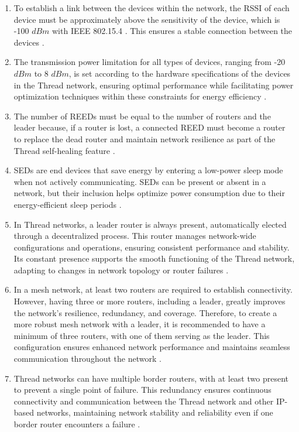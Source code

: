 \begin{enumerate}
    \item To establish a link between the devices within the network, the \gls{RSSI} of each device must be approximately above the sensitivity of the device, which is -100 $dBm$ with \gls{IEEE} 802.15.4 \cite{Semiconductor_Nordic_Product_Brief_2018_2.0}. This ensures a stable connection between the devices \cite{wu2014study}.
    \item The transmission power limitation for all types of devices, ranging from -20 $dBm$ to 8 $dBm$, is set according to the hardware specifications of the devices in the Thread network, ensuring optimal performance while facilitating power optimization techniques within these constraints for energy efficiency \cite{semiconductor_nrf52840_2018_1}.
    \item The number of \glspl{REED} must be equal to the number of routers and the leader because, if a router is lost, a connected \gls{REED} must become a router to replace the dead router and maintain network resilience as part of the Thread self-healing feature \cite{Thread_Group_Fundamentals}.
    \item \glspl{SED} are end devices that save energy by entering a low-power sleep mode when not actively communicating. \glspl{SED} can be present or absent in a network, but their inclusion helps optimize power consumption due to their energy-efficient sleep periods \cite{Thread_Group_Fundamentals}.
    \item In Thread networks, a leader router is always present, automatically elected through a decentralized process. This router manages network-wide configurations and operations, ensuring consistent performance and stability. Its constant presence supports the smooth functioning of the Thread network, adapting to changes in network topology or router failures \cite{Thread_Group_Fundamentals}.
    \item In a mesh network, at least two routers are required to establish connectivity. However, having three or more routers, including a leader, greatly improves the network's resilience, redundancy, and coverage. Therefore, to create a more robust mesh network with a leader, it is recommended to have a minimum of three routers, with one of them serving as the leader. This configuration ensures enhanced network performance and maintains seamless communication throughout the network \cite{girgis2014solving}.
    \item Thread networks can have multiple border routers, with at least two present to prevent a single point of failure. This redundancy ensures continuous connectivity and communication between the Thread network and other \gls{IP}-based networks, maintaining network stability and reliability even if one border router encounters a failure \cite{Thread_Group_Fundamentals}.
\end{enumerate}

